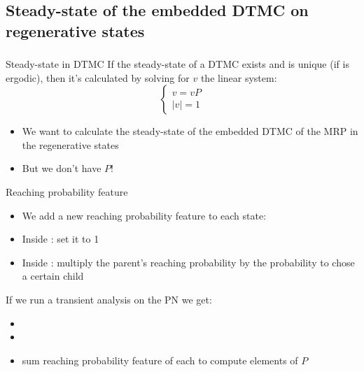 \subsection{Steady-state of the embedded \acs{DTMC} on regenerative
  states}
\begin{frame}
  \frametitle{\insertsubsection}
  \begin{block}{Steady-state in \acf{DTMC}}
    If the steady-state of a \acf{DTMC} exists and is unique (if is
    \alert{ergodic}), then it's calculated by solving for $v$ the linear
    system:\alert{
    \begin{equation*}
      \begin{cases}
        v=vP\\
        |v| = 1
      \end{cases}
    \end{equation*}
  }
  \end{block}
  \pause
  \begin{itemize}
  \item We want to calculate the \alert{steady-state} of the embedded \acs{DTMC} of the \acs{MRP} in
    the \alert{regenerative states}
    \pause
  \item But we don't have \alert{$P$}! 
  \end{itemize}
\end{frame}

\begin{frame}
  \begin{block}{Reaching probability feature}
    \begin{itemize}
    \item We add a new \alert{reaching probability feature} to each
      state: 
      \pause
    \item Inside : set it to
      1
      \pause
    \item Inside : multiply the
      parent's reaching probability by the probability to chose a
      certain child
    \end{itemize}
  \end{block}
  \pause
  If we run a transient analysis on the \acf{PN} we get:
  \pause
  \begin{itemize}
  \item {}
    \pause
  \item {\scriptsize{}}
    \pause
  \item sum reaching probability feature of each  to compute
    elements of \alert{$P$}
  \end{itemize}
\end{frame}

